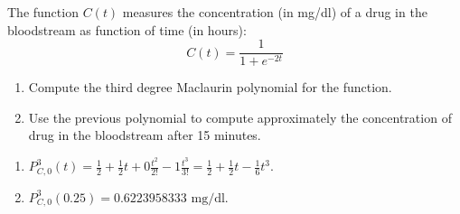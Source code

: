 {The function $C(t)$ measures the concentration (in mg/dl) of a drug in the bloodstream as function of time (in hours):
\[
C(t) = \frac{1}{{1 + e^{-2t}}}
\]
\begin{enumerate}
\item Compute the third degree Maclaurin polynomial for the function.

\item Use the previous polynomial to compute approximately the concentration of drug in the bloodstream after 15 minutes.
\end{enumerate}
}
{
\begin{enumerate}
\item $P_{C,0}^3(t)=\frac{1}{2}+\frac{1}{2}t+0\frac{t^2}{2!}-1\frac{t^3}{3!}=\frac{1}{2}+\frac{1}{2}t-\frac{1}{6}t^3$.
\item $P_{C,0}^3(0.25)= 0.6223958333 \mbox{ mg/dl}$.
\end{enumerate}
}
